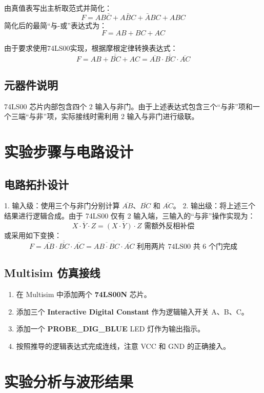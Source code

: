 \documentclass[12pt,a4paper]{article}
\begin{document}
由真值表写出主析取范式并简化：
$$F = AB\bar{C} + A\bar{B}C + \bar{A}BC + ABC$$
简化后的最简“与-或”表达式为：
$$F = AB + BC + AC$$

由于要求使用74LS00实现，根据摩根定律转换表达式：
$$F = \overline{\overline{AB + BC + AC}} = \overline{\overline{AB} \cdot \overline{BC} \cdot \overline{AC}}$$

\subsection{元器件说明}
74LS00 芯片内部包含四个 2 输入与非门。由于上述表达式包含三个“与非”项和一个三端“与非”项，实际接线时需利用 2 输入与非门进行级联。

\section{实验步骤与电路设计}

\subsection{电路拓扑设计}
1. 输入级：使用三个与非门分别计算 $\overline{AB}$、$\overline{BC}$ 和 $\overline{AC}$。
2. 输出级：将上述三个结果进行逻辑合成。由于 74LS00 仅有 2 输入端，三输入的“与非”操作实现为：
   $$\overline{X \cdot Y \cdot Z} = \overline{(X \cdot Y) \cdot Z} \text{ 需额外反相补偿}$$
   或采用如下变换：
   $$F = \overline{\overline{AB} \cdot \overline{BC} \cdot \overline{AC}} = \overline{\overline{AB \cdot BC} \cdot \overline{AC}} \text{ 利用两片 74LS00 共 6 个门完成}$$

\subsection{Multisim 仿真接线}
\begin{enumerate}
    \item 在 Multisim 中添加两个 \textbf{74LS00N} 芯片。
    \item 添加三个 \textbf{Interactive Digital Constant} 作为逻辑输入开关 A、B、C。
    \item 添加一个 \textbf{PROBE\_DIG\_BLUE} LED 灯作为输出指示。
    \item 按照推导的逻辑表达式完成连线，注意 VCC 和 GND 的正确接入。
\end{enumerate}

\section{实验分析与波形结果}
\end{document}

